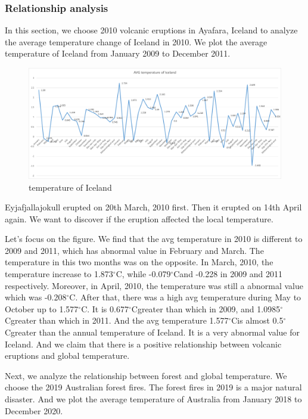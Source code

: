 \documentclass{apmcmthesis}
\def\oc{$^{\circ}$C\;}
\begin{document}
\subsubsection{Relationship analysis}
In this section, we choose 2010 volcanic eruptions in Ayafara, Iceland to analyze the average temperature change of Iceland in 2010.
We plot the average temperature of Iceland from January 2009 to December 2011.

\begin{figure}[htbp]
  \centering
  \includegraphics[scale=0.45]{Iceland.png}
  \caption{temperature of Iceland}\label{fig13}
\end{figure}

Eyjafjallajokull erupted on 20th March, 2010 first.
Then it erupted on 14th April again.
We want to discover if the eruption affected the local temperature. 

Let's focus on the figure.
We find that the avg temperature in 2010 is different to 2009 and 2011, which has abnormal value in February and March.
The temperature in this two months was on the opposite. 
In March, 2010, the temperature increase to 1.873\oc, while -0.079\oc and -0.228 in 2009 and 2011 respectively.
Moreover, in April, 2010, the temperature was still a abnormal value which was -0.208\oc.
After that, there was a high avg temperature during May to October up to 1.577\oc.
It is 0.677\oc greater than which in 2009, and 1.0985\oc greater than which in 2011.
And the avg temperature 1.577\oc is almost 0.5\oc greater than the annual temperature of Iceland.
It is a very abnormal value for Iceland.
And we claim that there is a positive relationship between volcanic eruptions and global temperature. 

Next, we analyze the relationship between forest and global temperature.
We choose the 2019 Australian forest fires.
The forest fires in 2019 is a major natural disaster. 
And we plot the average temperature of Australia from January 2018 to December 2020.
\end{document}
